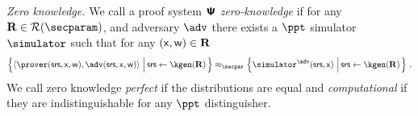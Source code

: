 \documentclass[runningheads,11pt]{llncs}
\newcommand{\ourpar}[1] {\smallskip\noindent\emph{#1}}
\begin{document}
 


\ourpar{Zero knowledge.}  We call a proof system $\bm{\mathsf{\Psi}}$
\emph{zero-knowledge} if for any $\REL \in \RELGEN(\secparam)$, and adversary
$\adv$ there exists a $\ppt$ simulator $\simulator$ such that for any
$(\mathsf{x}, \mathsf{w}) \in \mathbf{R}$
\begin{multline*}
	  \left\{\ip{\prover(\srs, \inp, \wit)}{\adv(\srs, \inp, \wit)}
      \,\left|\, \srs \gets \kgen(\REL)\COMMENT{, (\inp, \wit) \gets \adv(\REL,
          \srs)}\vphantom{\simulator^\adv}\right.\right\} \approx_\secpar
		\left\{\simulator^{\adv}(\srs, \inp)\,\left|\, \srs \gets
        \kgen(\REL)\COMMENT{, (\inp, \wit) \gets \adv(\REL,
          \srs)}\vphantom{\simulator^\adv}\right.\right\}\,.
\end{multline*}
We call zero knowledge \emph{perfect} if the distributions are equal and
\emph{computational} if they are indistinguishable for any $\ppt$ distinguisher.
\end{document}
